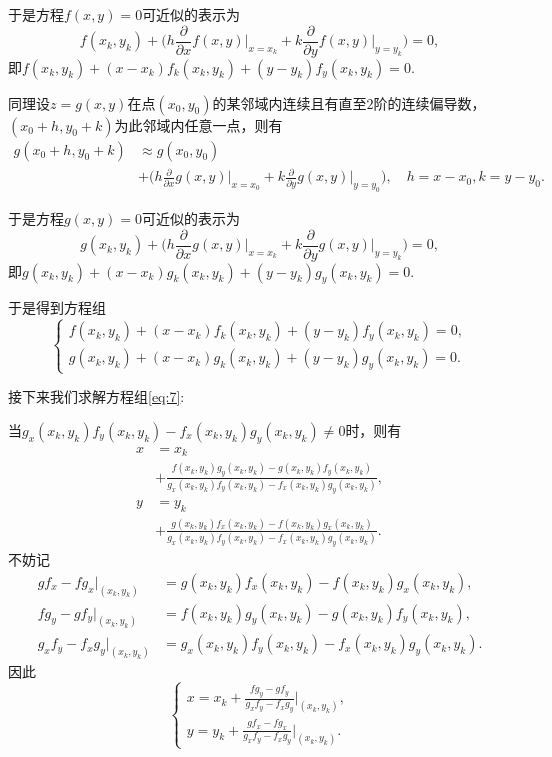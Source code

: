 \documentclass[cn,12pt,founder,a4paper]{elegantpaper}
\begin{document}
于是方程\(f(x,y)=0\)可近似的表示为
\[f(x_k,y_k)+\Big(h\frac{\partial}{\partial x}f(x,y)\Big\vert_{x=x_k}+k\frac{\partial}{\partial y}f(x,y)\Big\vert_{y=y_k}\Big)=0,\]
即\(f(x_k,y_k)+(x-x_k)f_k(x_k,y_k)+(y-y_k)f_y(x_k,y_k)=0\).\par
同理设\(z=g(x,y)\)在点\((x_0,y_0)\)的某邻域内连续且有直至\(2\)阶的连续偏导数，\((x_0+h,y_0+k)\)为此邻域内任意一点，则有
\begin{align*}
  g(x_0+h,y_0+k)&\approx g(x_0,y_0)\\
  &+\Big(h\frac{\partial}{\partial x}g(x,y)\Big\vert_{x=x_0}+k\frac{\partial}{\partial y}g(x,y)\Big\vert_{y=y_0}\Big),\quad h=x-x_0,k=y-y_0.
\end{align*}\par
于是方程\(g(x,y)=0\)可近似的表示为
\[g(x_k,y_k)+\Big(h\frac{\partial}{\partial x}g(x,y)\Big\vert_{x=x_k}+k\frac{\partial}{\partial y}g(x,y)\Big\vert_{y=y_k}\Big)=0,\]
即\(g(x_k,y_k)+(x-x_k)g_k(x_k,y_k)+(y-y_k)g_y(x_k,y_k)=0\).\par
于是得到方程组
\begin{equation}\label{eq:7}
  \begin{cases}
    f(x_k,y_k)+(x-x_k)f_k(x_k,y_k)+(y-y_k)f_y(x_k,y_k)=0,\\
    g(x_k,y_k)+(x-x_k)g_k(x_k,y_k)+(y-y_k)g_y(x_k,y_k)=0.
  \end{cases}
\end{equation}\par
接下来我们求解方程组\eqref{eq:7}:\par
当\(g_x(x_k,y_k)f_y(x_k,y_k)-f_x(x_k,y_k)g_y(x_k,y_k)\ne 0\)时，则有
\begin{align*}
  x&=x_k\\
  &+\frac{f(x_k,y_k)g_y(x_k,y_k)-g(x_k,y_k)f_y(x_k,y_k)}{g_x(x_k,y_k)f_y(x_k,y_k)-f_x(x_k,y_k)g_y(x_k,y_k)},\\
  y&=y_k\\
  &+\frac{g(x_k,y_k)f_x(x_k,y_k)-f(x_k,y_k)g_x(x_k,y_k)}{g_x(x_k,y_k)f_y(x_k,y_k)-f_x(x_k,y_k)g_y(x_k,y_k)}.
\end{align*}
不妨记
\begin{align*}
  gf_x-fg_x\vert_{(x_k,y_k)}&=g(x_k,y_k)f_x(x_k,y_k)-f(x_k,y_k)g_x(x_k,y_k),\\
  fg_y-gf_y\vert_{(x_k,y_k)}&=f(x_k,y_k)g_y(x_k,y_k)-g(x_k,y_k)f_y(x_k,y_k),\\
  g_xf_y-f_xg_y\vert_{(x_k,y_k)}&=g_x(x_k,y_k)f_y(x_k,y_k)-f_x(x_k,y_k)g_y(x_k,y_k).
\end{align*}
因此
\[
  \begin{cases}
    x=x_k+\frac{fg_y-gf_y}{g_xf_y-f_xg_y}\Big\vert_{(x_k,y_k)},\\[4pt]
    y=y_k+\frac{gf_x-fg_x}{g_xf_y-f_xg_y}\Big\vert_{(x_k,y_k)}.
  \end{cases}
\]
\end{document}
